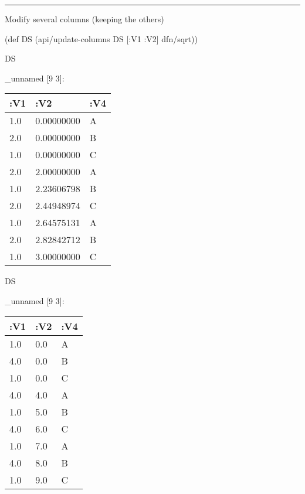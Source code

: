 \documentclass[]{article}
\newenvironment{Shaded}{\begin{snugshade}}{\end{snugshade}}
\newcommand{\AttributeTok}[1]{\textcolor[rgb]{0.77,0.63,0.00}{#1}}
\newcommand{\BuiltInTok}[1]{#1}
\newcommand{\DecValTok}[1]{\textcolor[rgb]{0.00,0.00,0.81}{#1}}
\newcommand{\FunctionTok}[1]{\textcolor[rgb]{0.00,0.00,0.00}{#1}}
\newcommand{\KeywordTok}[1]{\textcolor[rgb]{0.13,0.29,0.53}{\textbf{#1}}}
\newcommand{\NormalTok}[1]{#1}
\newcommand{\VariableTok}[1]{\textcolor[rgb]{0.00,0.00,0.00}{#1}}
\begin{document}
\begin{center}\rule{0.5\linewidth}{0.5pt}\end{center}

Modify several columns (keeping the others)

\begin{Shaded}
\begin{Highlighting}[]
\NormalTok{(}\BuiltInTok{def}\FunctionTok{ DS }\NormalTok{(api/update-columns DS [}\AttributeTok{:V1} \AttributeTok{:V2}\NormalTok{] dfn/sqrt))}
\end{Highlighting}
\end{Shaded}

\begin{Shaded}
\begin{Highlighting}[]
\NormalTok{DS}
\end{Highlighting}
\end{Shaded}

\_unnamed {[}9 3{]}:

\begin{longtable}[]{@{}lll@{}}
\toprule
:V1 & :V2 & :V4\tabularnewline
\midrule
\endhead
1.0 & 0.00000000 & A\tabularnewline
2.0 & 0.00000000 & B\tabularnewline
1.0 & 0.00000000 & C\tabularnewline
2.0 & 2.00000000 & A\tabularnewline
1.0 & 2.23606798 & B\tabularnewline
2.0 & 2.44948974 & C\tabularnewline
1.0 & 2.64575131 & A\tabularnewline
2.0 & 2.82842712 & B\tabularnewline
1.0 & 3.00000000 & C\tabularnewline
\bottomrule
\end{longtable}

\begin{Shaded}
\end{Shaded}

\begin{Shaded}
\begin{Highlighting}[]
\NormalTok{DS}
\end{Highlighting}
\end{Shaded}

\_unnamed {[}9 3{]}:

\begin{longtable}[]{@{}lll@{}}
\toprule
:V1 & :V2 & :V4\tabularnewline
\midrule
\endhead
1.0 & 0.0 & A\tabularnewline
4.0 & 0.0 & B\tabularnewline
1.0 & 0.0 & C\tabularnewline
4.0 & 4.0 & A\tabularnewline
1.0 & 5.0 & B\tabularnewline
4.0 & 6.0 & C\tabularnewline
1.0 & 7.0 & A\tabularnewline
4.0 & 8.0 & B\tabularnewline
1.0 & 9.0 & C\tabularnewline
\bottomrule
\end{longtable}
\end{document}
